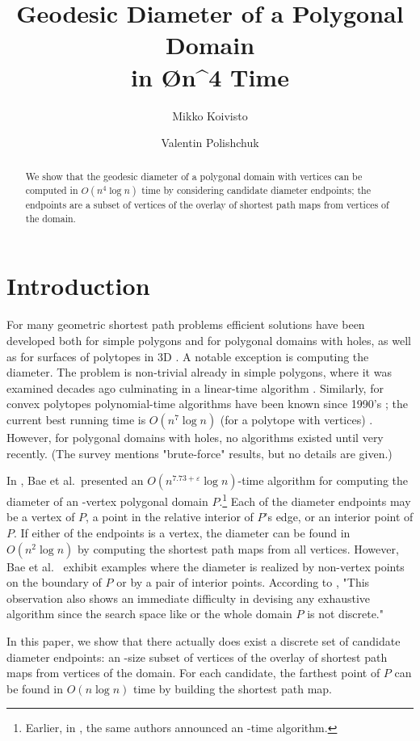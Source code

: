 \documentclass{llncs}
\title{Geodesic Diameter of a Polygonal Domain\\ in \O{n^{4}} Time}
\author{Mikko Koivisto \and Valentin Polishchuk}
\institute{Helsinki Institute for Information Technology HIIT\\ 
Department of Computer Science, University of Helsinki, Finland\\
\texttt{\{firstname.lastname\}@cs.helsinki.fi}}
\renewcommand\-{\textrm{-}}
\renewcommand{\O}[1]{\ensuremath{O(#1 \log n)}\xspace}
\renewcommand\P{\ensuremath{P}\xspace}
\newcommand\bae{\cite{bae}\xspace}
\begin{document}
\maketitle
\begin{abstract} We show that the geodesic diameter of a polygonal domain with  vertices can be computed in \O{n^{4}} time by considering  candidate diameter endpoints; the endpoints are a subset of vertices of the overlay of shortest path maps from vertices of the domain.\end{abstract}
\section{Introduction}
For many geometric shortest path problems efficient solutions have been developed both for simple polygons and for polygonal domains with holes, as well as for surfaces of polytopes in 3D \cite{survey}. A notable exception is computing the diameter. The problem is non-trivial already in simple polygons, where it was examined decades ago \cite{chazelleCutting,suriSimple} culminating in a linear-time algorithm \cite{hsMatrix}. Similarly, for convex polytopes polynomial-time algorithms have been known since 1990's \cite{orourke,star}; the current best running time is \O{n^7} (for a polytope with  vertices) \cite{atlas}. However, for polygonal domains with holes, no algorithms existed until very recently. (The survey \cite{survey} mentions "brute-force" results, but no details are given.)

In \bae, Bae et al.\ presented an \O{n^{7.73+\varepsilon}}-time algorithm for computing the diameter of an -vertex polygonal domain \P.\footnote{Earlier, in \cite{japan}, the same authors announced an -time algorithm.} Each of the diameter endpoints may be a vertex of \P, a point in the relative interior of \P's edge, or an interior point of \P. If either of the endpoints is a vertex, the diameter can be found in \O{n^2} by computing the shortest path maps \cite{survey,hs} from all vertices. However, Bae et al.\ \bae exhibit examples where the diameter is realized by non-vertex points on the boundary of \P or by a pair of interior points. According to \bae, "This observation also shows an immediate difficulty in devising any exhaustive algorithm since the search space like  or the whole domain \P is not discrete."

In this paper, we show that there actually does exist a discrete set of candidate diameter endpoints: an -size subset of vertices of the overlay of shortest path maps from vertices of the domain. For each candidate, the farthest point of \P can be found in \O{n} time by building the shortest path map.
\end{document}
